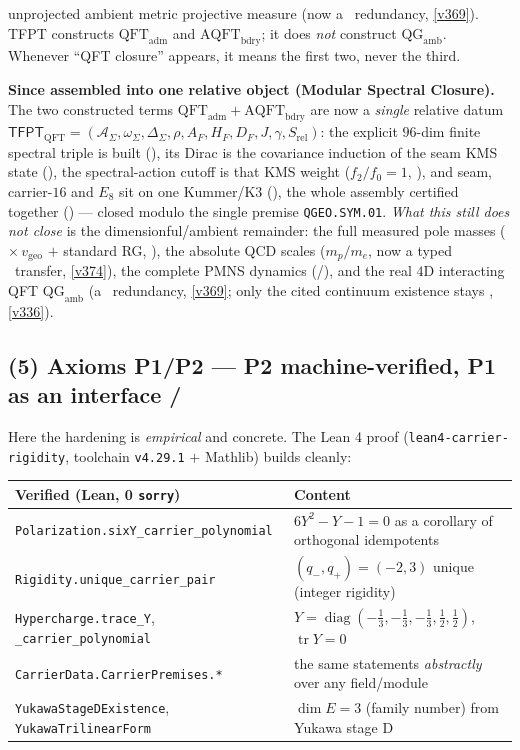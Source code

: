 \documentclass[11pt,a4paper]{article}
\theoremstyle{definition}
\renewcommand{\arraystretch}{1.15}
\begin{document}
unprojected ambient metric projective measure (now a \mC\ redundancy, \vref{v369}). TFPT constructs $\mathrm{QFT}_{\mathrm{adm}}$ and
$\mathrm{AQFT}_{\mathrm{bdry}}$; it does \emph{not} construct $\mathrm{QG}_{\mathrm{amb}}$. Whenever ``QFT
closure'' appears, it means the first two, never the third.
\par\smallskip\noindent\textbf{Since assembled into one relative object (Modular Spectral Closure).} The two
constructed terms $\mathrm{QFT}_{\mathrm{adm}}+\mathrm{AQFT}_{\mathrm{bdry}}$ are now a \emph{single} relative
datum $\mathsf{TFPT}_{\mathrm{QFT}}=(\mathcal A_\Sigma,\omega_\Sigma,\Delta_\Sigma,\rho,A_F,H_F,D_F,J,\gamma,
S_{\mathrm{rel}})$: the explicit $96$-dim finite spectral triple is built (),
its Dirac is the covariance induction of the seam KMS state (), the
spectral-action cutoff is that KMS weight ($f_2/f_0{=}1$, ), and seam,
carrier-$16$ and $E_8$ sit on one Kummer/K3 (), the whole assembly
certified together () --- closed modulo the single premise
\texttt{QGEO.SYM.01}. \emph{What this still does \emph{not} close} is the dimensionful/ambient remainder: the
full measured pole masses ($\times\,v_{\mathrm{geo}}$ $+$ standard RG, \mC), the absolute QCD scales
($m_p/m_e$, now a typed \mC\ transfer, \vref{v374}), the complete PMNS dynamics (\mC/\mO), and the real $4$D
interacting QFT $\mathrm{QG}_{\mathrm{amb}}$ (a \mC\ redundancy, \vref{v369}; only the cited continuum existence
stays \mO, \vref{v336}).

\subsection*{(5) Axioms P1/P2 --- P2 machine-verified, P1 as an interface \mE/\mO}
Here the hardening is \emph{empirical} and concrete. The Lean 4 proof (\texttt{lean4-carrier-rigidity},
toolchain \texttt{v4.29.1} $+$ Mathlib) builds cleanly:
\begin{center}\small
\renewcommand{\arraystretch}{1.15}
\begin{tabularx}{\linewidth}{@{}lY@{}}
\toprule
\textbf{Verified (Lean, 0 \texttt{sorry})} & \textbf{Content} \\
\midrule
\texttt{Polarization.sixY\_carrier\_polynomial} & $6Y^2-Y-1=0$ as a corollary of orthogonal idempotents \\
\texttt{Rigidity.unique\_carrier\_pair} & $(q_-,q_+)=(-2,3)$ unique (integer rigidity) \\
\texttt{Hypercharge.trace\_Y}, \texttt{\_carrier\_polynomial} & $Y=\operatorname{diag}(-\tfrac13,-\tfrac13,-\tfrac13,\tfrac12,\tfrac12)$, $\operatorname{tr}Y=0$ \\
\texttt{CarrierData.CarrierPremises.*} & the same statements \emph{abstractly} over any field/module \\
\texttt{YukawaStageDExistence}, \texttt{YukawaTrilinearForm} & $\dim E=3$ (family number) from Yukawa stage D \\
\bottomrule
\end{tabularx}
\end{center}
\end{document}
